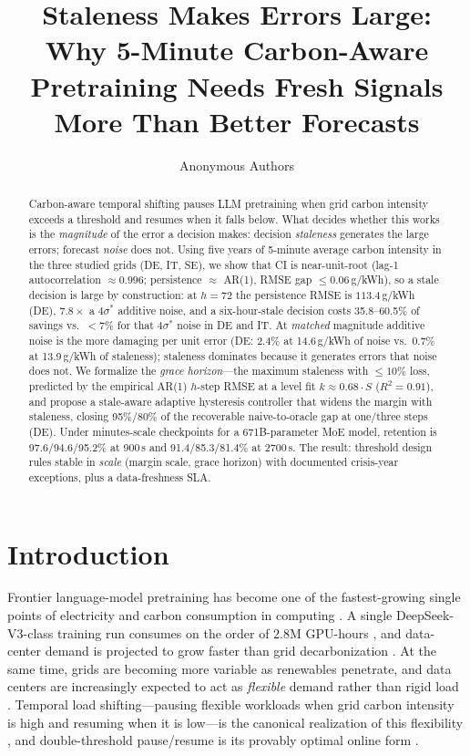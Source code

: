 \documentclass[sigconf,nonacm=false]{acmart}
\title{Staleness Makes Errors Large: Why 5-Minute Carbon-Aware Pretraining Needs Fresh Signals More Than Better Forecasts}
\author{Anonymous Authors}
\affiliation{%
  \institution{Anonymous Institution}
  \country{}}
\begin{document}
\begin{abstract}
Carbon-aware temporal shifting pauses LLM pretraining when grid carbon intensity
exceeds a threshold and resumes when it falls below. What decides whether this
works is the \emph{magnitude} of the error a decision makes: decision
\emph{staleness} generates the large errors; forecast \emph{noise} does not.
Using five years of 5-minute average carbon intensity in the three
studied grids (DE, IT, SE), we show that CI is near-unit-root (lag-1
autocorrelation $\approx0.996$; persistence $\approx$ AR(1), RMSE gap
$\le 0.06$\,g/kWh), so a stale decision is large by construction: at $h{=}72$
the persistence RMSE is $113.4$\,g/kWh (DE), $7.8\times$ a $4\sigma^*$ additive
noise, and a six-hour-stale decision costs 35.8--60.5\% of savings vs.\ $<$7\%
for that $4\sigma^*$ noise in DE and IT. At \emph{matched} magnitude additive noise is
the more damaging per unit error (DE: $2.4\%$ at 14.6\,g/kWh of noise vs.\
$0.7\%$ at 13.9\,g/kWh of staleness); staleness dominates because it generates
errors that noise does not. We formalize the \emph{grace horizon}---the maximum
staleness with $\le10\%$ loss, predicted by the empirical AR(1) $h$-step RMSE at
a level fit $k\approx0.68\cdot S$ ($R^2{=}0.91$), and propose a stale-aware
adaptive hysteresis controller that widens the margin with staleness, closing
95\%/80\% of the recoverable naive-to-oracle gap at one/three steps (DE). Under
minutes-scale checkpoints for a 671B-parameter MoE model, retention is
97.6/94.6/95.2\% at 900\,s and 91.4/85.3/81.4\% at 2700\,s. The result:
threshold design rules stable in \emph{scale} (margin scale, grace horizon)
with documented crisis-year exceptions, plus a data-freshness SLA.
\end{abstract}

\maketitle

\section{Introduction}
\label{sec:intro}

Frontier language-model pretraining has become one of the fastest-growing
single points of electricity and carbon consumption in computing
\cite{strubell2019energy,patterson2021carbon,wu2022sustainable}. A single
DeepSeek-V3-class training run consumes on the order of 2.8M GPU-hours
\cite{deepseek2024v3}, and data-center demand is projected to grow faster than
grid decarbonization \cite{maji2025crossroads}. At the same time, grids are
becoming more variable as renewables penetrate, and data centers are
increasingly expected to act as \emph{flexible} demand rather than rigid load
\cite{lin2024explodingai,lin2023adapting}. Temporal load shifting---pausing
flexible workloads when grid carbon intensity is high and resuming when it is
low---is the canonical realization of this flexibility \cite{radovanovic2022carbon,
wiesner2021letswait,dodge2022measuring}, and double-threshold pause/resume is its
provably optimal online form \cite{lechowicz2023opr}.
\end{document}
